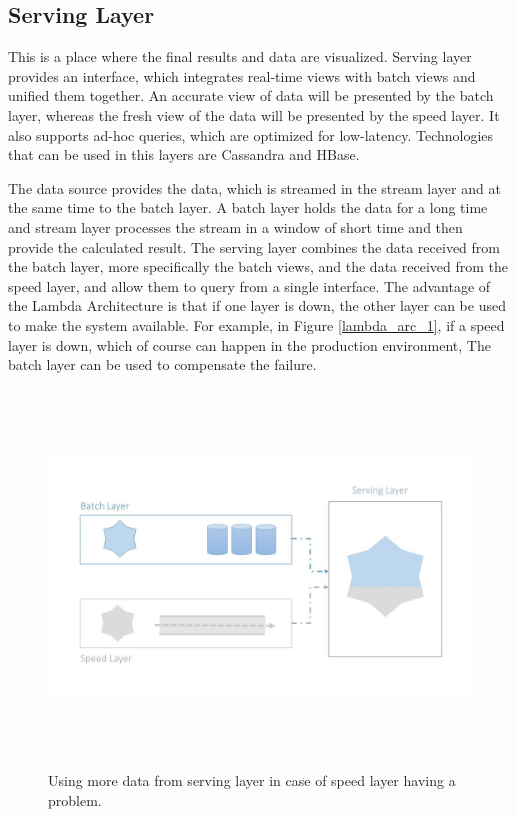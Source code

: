 \subsection{Serving Layer}
This is a place where the final results and data are visualized. Serving layer provides an interface, which integrates real-time views with batch views and unified them together. An accurate view of data will be presented by the batch layer, whereas the fresh view of the data will be presented by the speed layer. It also supports ad-hoc queries, which are optimized for low-latency. Technologies that can be used in this layers are Cassandra and HBase.

The data source provides the data, which is streamed in the stream layer and at the same time to the batch layer. A batch layer holds the data for a long time and stream layer processes the stream in a window of short time and then provide the calculated result. The serving layer combines the data received from the batch layer, more specifically the batch views, and the data received from the speed layer, and allow them to query from a single interface. The advantage of the Lambda Architecture is that if one layer is down, the other layer can be used to make the system available. For example, in Figure \ref{lambda_arc_1}, if a speed layer is down, which of course can happen in the production environment, The batch layer can be used to compensate the failure.


\begin{figure}[htpb]
	\centering
	\includegraphics[width=12cm,height=10cm,keepaspectratio=true]{images/lambda_arc_1}
	\caption{
		Using more data from serving layer in case of speed layer having a problem.
	}
	\label{fig:lambda_arc_1}
\end{figure}

